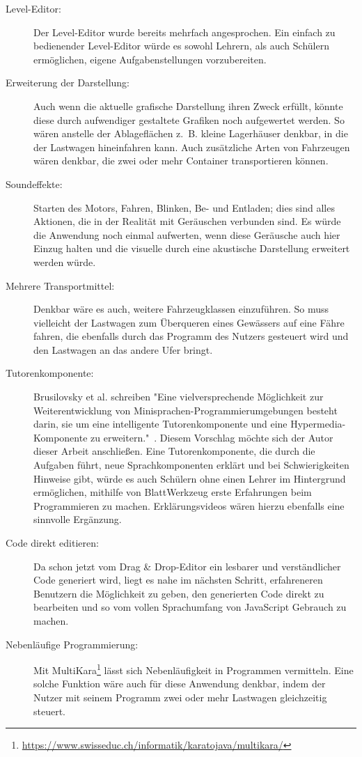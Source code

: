\begin{description}
  \item[Level-Editor:] Der Level-Editor wurde bereits mehrfach angesprochen. Ein einfach zu bedienender Level-Editor würde es sowohl Lehrern, als auch Schülern ermöglichen, eigene Aufgabenstellungen vorzubereiten.
  \item[Erweiterung der Darstellung:] Auch wenn die aktuelle grafische Darstellung ihren Zweck erfüllt, könnte diese durch aufwendiger gestaltete Grafiken noch aufgewertet werden. So wären anstelle der Ablageflächen z.~B. kleine Lagerhäuser denkbar, in die der Lastwagen hineinfahren kann. Auch zusätzliche Arten von Fahrzeugen wären denkbar, die zwei oder mehr Container transportieren können.
  \item[Soundeffekte:] Starten des Motors, Fahren, Blinken, Be- und Entladen; dies sind alles Aktionen, die in der Realität mit Geräuschen verbunden sind. Es würde die Anwendung noch einmal aufwerten, wenn diese Geräusche auch hier Einzug halten und die visuelle durch eine akustische Darstellung erweitert werden würde.
  \item[Mehrere Transportmittel:] Denkbar wäre es auch, weitere Fahrzeugklassen einzuführen. So muss vielleicht der Lastwagen zum Überqueren eines Gewässers auf eine Fähre fahren, die ebenfalls durch das Programm des Nutzers gesteuert wird und den Lastwagen an das andere Ufer bringt.
  \item[Tutorenkomponente:] Brusilovsky et al. schreiben "Eine vielversprechende Möglichkeit zur Weiterentwicklung von Minisprachen-Programmierumgebungen besteht darin, sie um eine intelligente Tutorenkomponente und eine Hypermedia-Komponente zu erweitern."~\cite[80]{brusilovsky1997}. Diesem Vorschlag möchte sich der Autor dieser Arbeit anschließen. Eine Tutorenkomponente, die durch die Aufgaben führt, neue Sprachkomponenten erklärt und bei Schwierigkeiten Hinweise gibt, würde es auch Schülern ohne einen Lehrer im Hintergrund ermöglichen, mithilfe von BlattWerkzeug erste Erfahrungen beim Programmieren zu machen. Erklärungsvideos wären hierzu ebenfalls eine sinnvolle Ergänzung.
  \item[Code direkt editieren:] Da schon jetzt vom Drag \& Drop-Editor ein lesbarer und verständlicher Code generiert wird, liegt es nahe im nächsten Schritt, erfahreneren Benutzern die Möglichkeit zu geben, den generierten Code direkt zu bearbeiten und so vom vollen Sprachumfang von JavaScript Gebrauch zu machen.
  \item[Nebenläufige Programmierung:] Mit MultiKara\footnote{\url{https://www.swisseduc.ch/informatik/karatojava/multikara/}} lässt sich Nebenläufigkeit in Programmen vermitteln. Eine solche Funktion wäre auch für diese Anwendung denkbar, indem der Nutzer mit seinem Programm zwei oder mehr Lastwagen gleichzeitig steuert.
\end{description}
